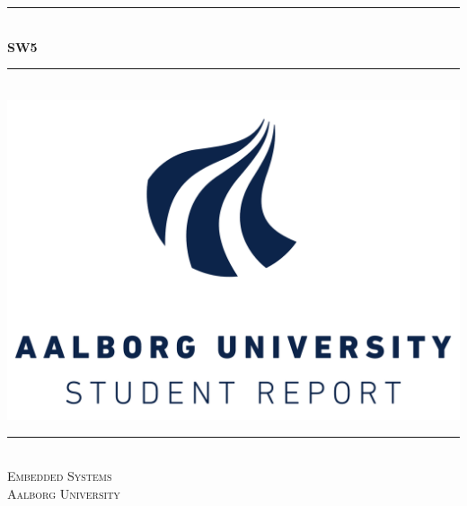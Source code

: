 \begin{titlingpage}

  \centering
  \rule{\linewidth}{0.2 mm} \\[0.5 cm]
  { \huge \bfseries SW5}\\
  \rule{\linewidth}{0.2 mm} \\[2 cm]
  \includegraphics[scale=0.30]{images/aau_logo.pdf}\\[2 cm]
  \rule{\linewidth}{0.2 mm} \\[0.3 cm]
  \textsc{\LARGE Embedded Systems} \\[0.5 cm]
  \textsc{\large Aalborg University}\\[0.5 cm]
  {\Large \groupnumber}\\[0.5 cm]

\end{titlingpage}
